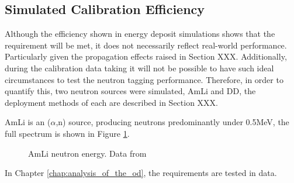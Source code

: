 \subsection{Simulated Calibration Efficiency}
\par
Although the efficiency shown in energy deposit simulations shows that the requirement will be met, it does not necessarily reflect real-world performance.
Particularly given the propagation effects raised in Section XXX.
Additionally, during the calibration data taking it will not be possible to have such ideal circumstances to test the neutron tagging performance.
Therefore, in order to quantify this, two neutron sources were simulated, AmLi and DD, the deployment methods of each are described in Section XXX.

\par
AmLi is an ($\alpha$,n) source, producing neutrons predominantly under 0.5MeV, the full spectrum is shown in Figure \ref{fig:amli_neutron_energy_spectrum}.

\begin{figure}[!htbp]
    \centering
    \caption{AmLi neutron energy. Data from \cite{amli_neutron_energy_ref} }
    \label{fig:amli_neutron_energy_spectrum}
\end{figure}


\par
In Chapter \ref{chap:analysis_of_the_od}, the requirements are tested in data.


